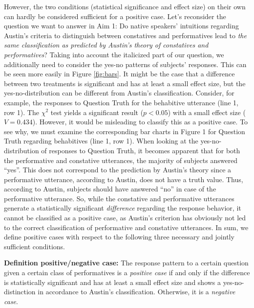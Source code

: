 \documentclass[egregdoesnotlikesansseriftitles,12pt]{scrartcl}
\begin{document}
\noindent However, the two conditions (statistical significance and effect size) on their own can hardly be considered sufficient for a positive case. Let's reconsider the question we want to answer in Aim 1: Do native speakers' intuitions regarding Austin's criteria to distinguish between constatives and performatives lead to \textit{the same classification as predicted by Austin's theory of constatives and performatives}? Taking into account the italicized part of our question, we additionally need to consider the yes-no patterns of subjects' responses. This can be seen more easily in Figure \ref{fig:bars}. It might be the case that a difference between two treatments is significant and has at least a small effect size, but the yes-no-distribution can be different from Austin's classification. Consider, for example, the responses to Question Truth for the behabitive utterance (line 1, row 1). The $\chi^2$ test yields a significant result ($p<0.05$) with a small effect size ($V=0.434$). However, it would be misleading to classify this as a positive case. To see why, we must examine the corresponding bar charts in Figure 1 for Question Truth regarding behabitives (line 1, row 1). When looking at the yes-no-distribution of responses to Question Truth, it becomes apparent that for both the performative and constative utterances, the majority of subjects answered ``yes''. This does not correspond to the prediction by Austin's theory since a performative utterance, according to Austin, does not have a truth value. Thus, according to Austin, subjects should have answered ``no'' in case of the performative utterance. So, while the constative and performative utterances generate a statistically significant \textit{difference} regarding the response behavior, it cannot be classified as a positive case, as Austin's criterion has obviously not led to the correct classification of performative and constative utterances. In sum, we define positive cases with respect to the following three necessary and jointly sufficient conditions.\\

\begin{addmargin}[11pt]{0pt}
   \textbf{Definition positive/negative case:} The response pattern to a certain question given a certain class of performatives is a \textit{positive case} if and only if the difference is statistically significant and has at least a small effect size and shows a yes-no-distinction in accordance to Austin's classification. Otherwise, it is a \textit{negative case}.\\
\end{addmargin}
\end{document}
